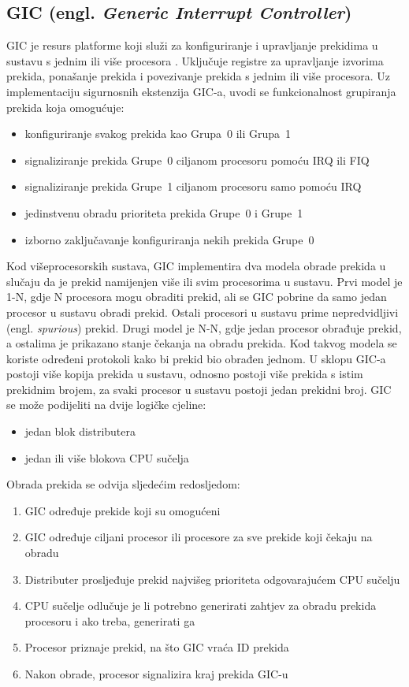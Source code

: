 \documentclass[times, utf8, diplomski, numeric]{fer}
\begin{document}
\subsection{GIC (engl. \textit{Generic Interrupt Controller})}
GIC je resurs platforme koji služi za konfiguriranje i upravljanje prekidima u sustavu s jednim ili više procesora
\cite{gic}.
Uključuje registre za upravljanje izvorima prekida, ponašanje prekida i povezivanje prekida s jednim ili više
procesora. Uz implementaciju sigurnosnih ekstenzija GIC-a, uvodi se funkcionalnost grupiranja prekida koja omogućuje:
\begin{itemize}
  \item{konfiguriranje svakog prekida kao Grupa~0 ili Grupa~1}
  \item{signaliziranje prekida Grupe~0 ciljanom procesoru pomoću IRQ ili FIQ}
  \item{signaliziranje prekida Grupe~1 ciljanom procesoru samo pomoću IRQ}
  \item{jedinstvenu obradu prioriteta prekida Grupe~0 i Grupe~1}
  \item{izborno zaključavanje konfiguriranja nekih prekida Grupe~0}
\end{itemize}
Kod višeprocesorskih sustava, GIC implementira dva modela obrade prekida u slučaju da je prekid namijenjen više
ili svim procesorima u sustavu. Prvi model je 1-N, gdje N procesora mogu obraditi prekid, ali se GIC pobrine da samo
jedan procesor u sustavu obradi prekid. Ostali procesori u sustavu prime nepredvidljivi (engl. \textit{spurious}) prekid.
Drugi model je N-N, gdje jedan procesor obrađuje prekid, a ostalima je prikazano stanje čekanja na obradu prekida.
Kod takvog modela se koriste određeni protokoli kako bi prekid bio obrađen jednom. U sklopu GIC-a postoji više kopija
prekida u sustavu, odnosno postoji više prekida s istim prekidnim brojem, za svaki procesor u sustavu postoji jedan prekidni
broj. GIC se može podijeliti na dvije logičke cjeline:
\begin{itemize}
  \item{jedan blok distributera}
  \item{jedan ili više blokova CPU sučelja}
\end{itemize}
Obrada prekida se odvija sljedećim redosljedom:
\begin{enumerate}
  \item{GIC određuje prekide koji su omogućeni}
  \item{GIC određuje ciljani procesor ili procesore za sve prekide koji čekaju na obradu}
  \item{Distributer prosljeđuje prekid najvišeg prioriteta odgovarajućem CPU sučelju}
  \item{CPU sučelje odlučuje je li potrebno generirati zahtjev za obradu prekida procesoru i ako treba, generirati ga}
  \item{Procesor priznaje prekid, na što GIC vraća ID prekida}
  \item{Nakon obrade, procesor signalizira kraj prekida GIC-u}
\end{enumerate}
\end{document}
